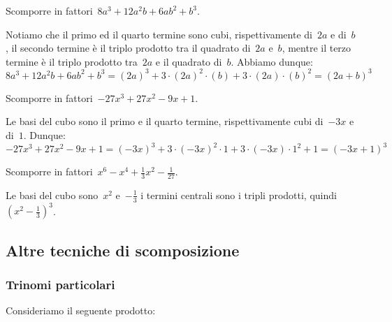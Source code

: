 \begin{exrig}
 \begin{esempio}
Scomporre in fattori~$8a^{3}+12a^{2}b+6{ab}^{2}+b^{3}$.

Notiamo che il primo ed il quarto termine sono cubi, rispettivamente di~$2a$ e 
di~$b$, il secondo termine è il triplo prodotto tra il quadrato di~$2a$ e~$b$, 
mentre il terzo termine è il triplo prodotto tra~$2a$ e il quadrato di~$b$.
Abbiamo dunque:
\[8a^{3}+12a^{2}b+6ab^{2}+b^{3}=
  (2a)^{3}+3\cdot (2a)^{2}\cdot (b)+3\cdot (2a)\cdot (b)^{2}=(2a+b)^{3}\]
 \end{esempio}

 \begin{esempio}
Scomporre in fattori~$-27x^{3}+27x^{2}-9x+1$.

Le basi del cubo sono il primo e il quarto termine, rispettivamente cubi 
di~$-3x$ e di~$1$.
Dunque:
\[-27x^{3}+27x^{2}-9x+1=
  (-3x)^{3}+3\cdot (-3x)^{2}\cdot 1+3\cdot (-3x)\cdot 1^{2}+1=(-3x+1)^{3}\]
 \end{esempio}

 \begin{esempio}
Scomporre in fattori~$x^{6}-x^{4}+\frac{1}{3}x^{2}-\frac{1}{27}$.

Le basi del cubo sono~$x^{2}$ e~$-\frac{1}{3}$ i termini centrali sono i 
tripli prodotti, quindi~$\left(x^{2}-\frac{1}{3}\right)^{3}$.
\end{esempio}
\end{exrig}





\subsection{Altre tecniche di scomposizione}
\label{subsec:divpol_altretecniche}

\subsubsection{Trinomi particolari}
\label{subsubsec:trinpart}

Consideriamo il seguente prodotto:

